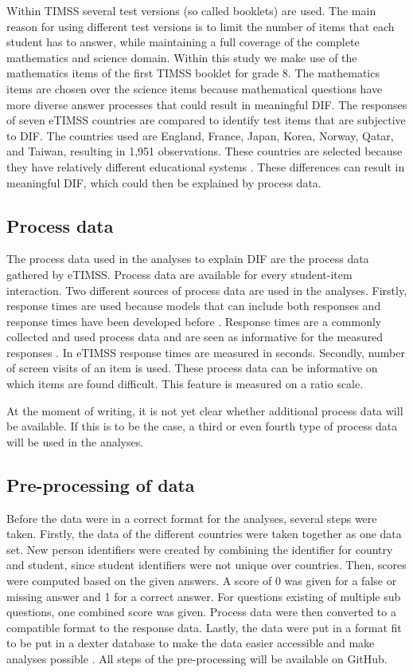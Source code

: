 \documentclass{article}
\begin{document}
Within TIMSS several test versions (so called booklets) are used. The main reason for using different test versions is to limit the number of items that each student has to answer, while maintaining a full coverage of the complete mathematics and science domain. Within this study we make use of the mathematics items of the first TIMSS booklet for grade 8. The mathematics items are chosen over the science items because mathematical questions have more diverse answer processes that could result in meaningful DIF. The responses of seven eTIMSS countries are compared to identify test items that are subjective to DIF. The countries used are England, France, Japan, Korea, Norway, Qatar, and Taiwan, resulting in 1,951 observations. These countries are selected because they have relatively different educational systems \parencite{hofstede1986cultural}. These differences can result in meaningful DIF, which could then be explained by process data.

\vspace{3mm}
\subsection*{Process data}
The process data used in the analyses to explain DIF are the process data gathered by eTIMSS. Process data are available for every student-item interaction. Two different sources of process data are used in the analyses. Firstly, response times are used because models that can include both responses and response times have been developed before \parencite{molenaar2015generalized, van2007hierarchical}. Response times are a commonly collected and used process data and are seen as informative for the measured responses \parencite{molenaar2015value}. In eTIMSS response times are measured in seconds. Secondly, number of screen visits of an item is used. These process data can be informative on which items are found difficult. This feature is measured on a ratio scale. 

At the moment of writing, it is not yet clear whether additional process data will be available. If this is to be the case, a third or even fourth type of process data will be used in the analyses.

\subsection*{Pre-processing of data}
Before the data were in a correct format for the analyses, several steps were taken. Firstly, the data of the different countries were taken together as one data set. New person identifiers were created by combining the identifier for country and student, since student identifiers were not unique over countries. Then, scores were computed based on the given answers. A score of 0 was given for a false or missing answer and 1 for a correct answer. For questions existing of multiple sub questions, one combined score was given. Process data were then converted to a compatible format to the response data. Lastly, the data were put in a format fit to be put in a dexter database to make the data easier accessible and make analyses possible \parencite{maris2018dexter}. All steps of the pre-processing will be available on GitHub.
\end{document}
